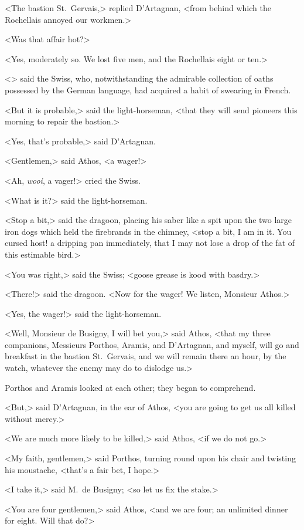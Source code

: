 <The bastion St.~Gervais,> replied D'Artagnan, <from behind which the Rochellais annoyed our workmen.> 

<Was that affair hot?> 

<Yes, moderately so. We lost five men, and the Rochellais eight or ten.> 

<> said the Swiss, who, notwithstanding the admirable collection of oaths possessed by the German language, had acquired a habit of swearing in French. 

<But it is probable,> said the light-horseman, <that they will send pioneers this morning to repair the bastion.> 

<Yes, that's probable,> said D'Artagnan. 

<Gentlemen,> said Athos, <a wager!> 

<Ah, \textit{wooi}, a vager!> cried the Swiss. 

<What is it?> said the light-horseman. 

<Stop a bit,> said the dragoon, placing his saber like a spit upon the two large iron dogs which held the firebrands in the chimney, <stop a bit, I am in it. You cursed host! a dripping pan immediately, that I may not lose a drop of the fat of this estimable bird.> 

<You was right,> said the Swiss; <goose grease is kood with basdry.> 

<There!> said the dragoon. <Now for the wager! We listen, Monsieur Athos.> 

<Yes, the wager!> said the light-horseman. 

<Well, Monsieur de Busigny, I will bet you,> said Athos, <that my three companions, Messieurs Porthos, Aramis, and D'Artagnan, and myself, will go and breakfast in the bastion St.~Gervais, and we will remain there an hour, by the watch, whatever the enemy may do to dislodge us.> 

Porthos and Aramis looked at each other; they began to comprehend. 

<But,> said D'Artagnan, in the ear of Athos, <you are going to get us all killed without mercy.> 

<We are much more likely to be killed,> said Athos, <if we do not go.> 

<My faith, gentlemen,> said Porthos, turning round upon his chair and twisting his moustache, <that's a fair bet, I hope.> 

<I take it,> said M.~de Busigny; <so let us fix the stake.> 

<You are four gentlemen,> said Athos, <and we are four; an unlimited dinner for eight. Will that do?> 


